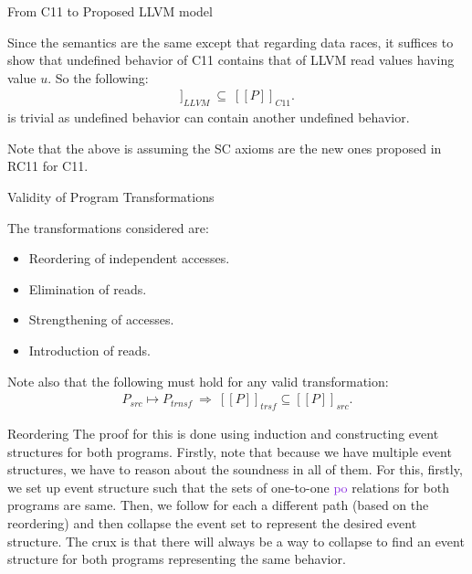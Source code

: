 \documentclass[xcolor=dvipsnames, notes]{beamer}
\newcommand{\po}{\textcolor{BlueViolet}{po}}
\begin{document}
    \begin{frame}{From C11 to Proposed LLVM model}

        Since the semantics are the same except that regarding data races, it suffices to show that undefined behavior of C11 contains that of LLVM read values having value $u$.
        So the following:
        \begin{align*}
            [[P]]_{LLVM} \ \subseteq \ [[P]]_{C11}.
        \end{align*}
        is trivial as undefined behavior can contain another undefined behavior. 
        
        Note that the above is assuming the SC axioms are the new ones proposed in RC11 for C11.

    \end{frame}

    \begin{frame}{Validity of Program Transformations}

        The transformations considered are:
        \begin{itemize}
            \item Reordering of independent accesses.
            \item Elimination of reads.
            \item Strengthening of accesses.
            \item Introduction of reads.
        \end{itemize}

        Note also that the following must hold for any valid transformation:
        \begin{align*}
            P_{src} \mapsto P_{trnsf} \ \Rightarrow \ [[P]]_{trsf} \subseteq [[P]]_{src}.
        \end{align*}
    \end{frame}

    \begin{frame}{Reordering}
        The proof for this is done using induction and constructing event structures for both programs. 
        Firstly, note that because we have multiple event structures, we have to reason about the soundness in all of them.
        For this, firstly, we set up event structure such that the sets of one-to-one {\po} relations for both programs are same. 
        Then, we follow for each a different path (based on the reordering) and then collapse the event set to represent the desired event structure.
        The crux is that there will always be a way to collapse to find an event structure for both programs representing the same behavior.
    \end{frame}
\end{document}
